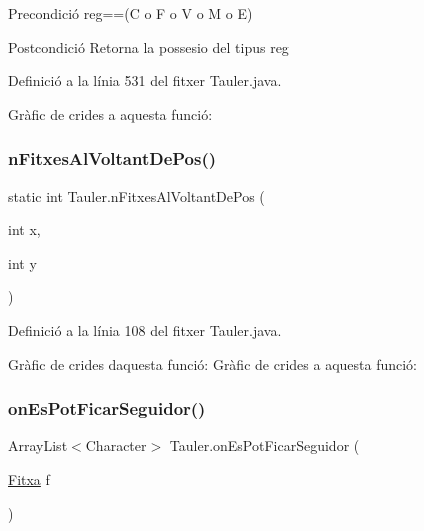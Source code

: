 \begin{DoxyPrecond}{Precondició}
reg==(\textquotesingle{}C\textquotesingle{} o \textquotesingle{}F\textquotesingle{} o \textquotesingle{}V\textquotesingle{} o \textquotesingle{}M\textquotesingle{} o \textquotesingle{}E\textquotesingle{}) 
\end{DoxyPrecond}
\begin{DoxyPostcond}{Postcondició}
Retorna la possesio del tipus reg 
\end{DoxyPostcond}


Definició a la línia 531 del fitxer Tauler.\+java.

Gràfic de crides a aquesta funció\+:
\mbox{\label{class_tauler_af5a38a09a2f0cfb5f87519f0ec327552}} 
\subsubsection{\texorpdfstring{n\+Fitxes\+Al\+Voltant\+De\+Pos()}{nFitxesAlVoltantDePos()}}
{\footnotesize\ttfamily static int Tauler.\+n\+Fitxes\+Al\+Voltant\+De\+Pos (\begin{DoxyParamCaption}\item[{int}]{x,  }\item[{int}]{y }\end{DoxyParamCaption})\hspace{0.3cm}{\ttfamily [static]}}



Definició a la línia 108 del fitxer Tauler.\+java.

Gràfic de crides d\textquotesingle{}aquesta funció\+:
Gràfic de crides a aquesta funció\+:
\mbox{\label{class_tauler_a936880dfa43da6f75cdad1edd82495c2}} 
\subsubsection{\texorpdfstring{on\+Es\+Pot\+Ficar\+Seguidor()}{onEsPotFicarSeguidor()}}
{\footnotesize\ttfamily Array\+List$<$Character$>$ Tauler.\+on\+Es\+Pot\+Ficar\+Seguidor (\begin{DoxyParamCaption}\item[{\mbox{\hyperlink{class_fitxa}{Fitxa}}}]{f }\end{DoxyParamCaption})}

